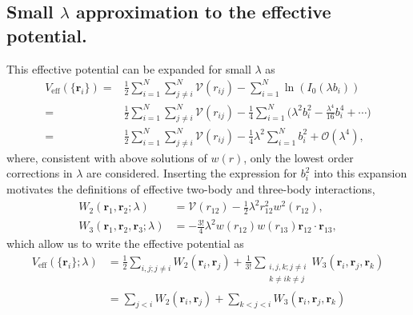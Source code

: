 \documentclass[twocolumn,amsmath,amssymb,aps]{revtex4-1}%
\begin{document}
\subsection{Small $\lambda$ approximation to the effective potential.}
This effective potential can be expanded for small $\lambda$ as
\begin{align}
  V_{\mathrm{eff}}(\{\bm{r}_i\})
  =&\frac{1}{2}\sum_{i=1}^N\sum_{j\neq i}^N\mathcal{V}(r_{ij})%
  -\sum_{i=1}^N\ln(I_0(\lambda b_i))
  \nonumber\\
  =&\frac{1}{2}\sum_{i=1}^N\sum_{j\neq i}^N\mathcal{V}(r_{ij})%
  -\frac{1}{4}\sum_{i=1}^N\bigg(\lambda^2b_i^2
  -\frac{\lambda^4}{16}b_i^4+\cdots\bigg)
  \nonumber\\
  =&\frac{1}{2}\sum_{i=1}^N\sum_{j\neq i}^N\mathcal{V}(r_{ij})
  -\frac{1}{4}\lambda^2\sum_{i=1}^Nb_i^2+\mathcal{O}(\lambda^4),
\end{align}
where, consistent with above solutions of $w(r)$, only the lowest order
corrections in $\lambda$ are considered. Inserting the expression for
$b_i^2$ into this expansion motivates the definitions of effective
two-body and three-body interactions,
\begin{subequations}
  \label{eqs:2and3body}
  \begin{align}
    W_2(\bm{r}_1,\bm{r}_2;\lambda)
    &= \mathcal{V}(r_{12})
      -\frac{1}{2}\lambda^2 r_{12}^2w^2(r_{12}),\label{eq:2body}\\
    W_3(\bm{r}_1,\bm{r}_2,\bm{r}_3;\lambda)
    &= -\frac{3!}{4}\lambda^2w(r_{12})w(r_{13})\bm{r}_{12}\cdot\bm{r}_{13},
      \label{eq:3body}
  \end{align}
\end{subequations}
which allow us to write the effective potential as
\begin{align}\label{eq:Vthreebody}
  V_{\mathrm{eff}}(\{\bm{r}_i\};\lambda)
  &=\frac{1}{2}\sum_{i,j;j\neq i}W_2(\bm{r}_i,\bm{r}_j)
    +\frac{1}{3!}\sum_{\substack{i,j,k;j\neq i \\k\neq i k\neq j}}
    W_3(\bm{r}_i,\bm{r}_j,\bm{r}_k)\nonumber\\
  &=\sum_{j<i}W_2(\bm{r}_i,\bm{r}_j)
    +\sum_{k<j<i}
    W_3(\bm{r}_i,\bm{r}_j,\bm{r}_k)
\end{align}
\end{document}
